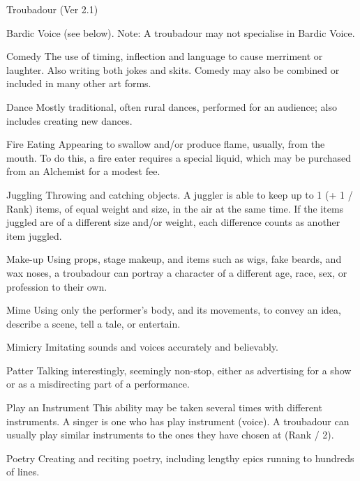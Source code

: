 \begin{Chapter}{Troubadour (Ver 2.1)}
\begin{Description}
\item[Bardic Voice] (see below).  Note: A troubadour may not
  specialise in Bardic Voice.

\item[Comedy] The use of timing, inflection and language to cause
  merriment or laughter. Also writing both jokes and skits.  Comedy
  may also be combined or included in many other art forms.

\item[Dance] Mostly traditional, often rural dances, performed for an
  audience; also includes creating new dances.

\item[Fire Eating] Appearing to swallow and/or produce flame, usually,
  from the mouth.  To do this, a fire eater requires a special liquid,
  which may be purchased from an Alchemist for a modest fee.

\item[Juggling] Throwing and catching objects. A juggler is able to
  keep up to 1 (+ 1 / Rank) items, of equal weight and size, in the
  air at the same time.  If the items juggled are of a different size
  and/or weight, each difference counts as another item juggled.

\item[Make-up] Using props, stage makeup, and items such as wigs, fake
  beards, and wax noses, a troubadour can portray a character of a
  different age, race, sex, or profession to their own.

\item[Mime] Using only the performer’s body, and its movements, to
  convey an idea, describe a scene, tell a tale, or entertain.

\item[Mimicry] Imitating sounds and voices accurately and believably.

\item[Patter] Talking interestingly, seemingly non-stop, either as
  advertising for a show or as a misdirecting part of a performance.

\item[Play an Instrument] This ability may be taken several times with
  different instruments.  A singer is one who has play instrument
  (voice).  A troubadour can usually play similar instruments to the
  ones they have chosen at (Rank / 2).

\item[Poetry] Creating and reciting poetry, including lengthy epics
  running to hundreds of lines.


\end{Description}
\end{Chapter}
